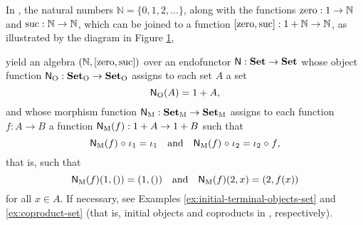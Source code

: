 \begin{example}%
  \label{ex:algebra-natural-numbers}

  \parencite[18--19]{vene-2000}

  In \set, the natural numbers $\mathbb{N} = \{0,1,2,...\}$, along
  with the functions $\operatorname{zero}: 1 \to \mathbb{N}$ and $\operatorname{suc}: \mathbb{N}
  \to \mathbb{N}$, which can be joined to a function $[\operatorname{zero},\operatorname{suc}]: 1
  + \mathbb{N} \to \mathbb{N}$, as illustrated by the diagram in
  Figure \ref{fig:coproduct-natural-numbers},
  \begin{figure}[htbp]
    \begin{center}
    \end{center}
    \caption{}
    \label{fig:coproduct-natural-numbers}
  \end{figure}
  yield an algebra $(\mathbb{N},[\operatorname{zero},\operatorname{suc}])$ over an endofunctor
  $\mathsf{N}: \mathbf{Set} \to \mathbf{Set}$ whose object function $\mathsf{N}_{\operatorname{O}}:
  \mathcal{\mathbf{Set}}_{\operatorname{O}} \to \mathcal{\mathbf{Set}}_{\operatorname{O}}$ assigns to each set $A$ a set
  \begin{equation*}
    \mathsf{N}_{\operatorname{O}}(A) = 1 + A
    \text{,}
  \end{equation*}
  and whose morphism function $\mathsf{N}_{\operatorname{M}}: \mathcal{\mathbf{Set}}_{\operatorname{M}} \to \mathcal{\mathbf{Set}}_{\operatorname{M}}$
  assigns to each function $f: A \to B$ a function $\mathsf{N}_{\operatorname{M}}(f): 1 +
  A \to 1 + B$ such that
  \begin{equation*}
    \mathsf{N}_{\operatorname{M}}(f) \mathrel{\circ} \iota_{1} = \iota_{1}
    \quad
    \text{and}
    \quad
    \mathsf{N}_{\operatorname{M}}(f) \mathrel{\circ} \iota_{2} = \iota_{2} \mathrel{\circ} f
    \text{,}
  \end{equation*}
  that is, such that
  \begin{equation*}
    \mathsf{N}_{\operatorname{M}}(f)(1,()) = (1,())
    \quad
    \text{and}
    \quad
    \mathsf{N}_{\operatorname{M}}(f)(2,x) = (2,f(x))
  \end{equation*}
  for all $x \in A$. If necessary, see Examples
  \ref{ex:initial-terminal-objects-set} and \ref{ex:coproduct-set}
  (that is, initial objects and coproducts in \set, respectively).

\end{example}

